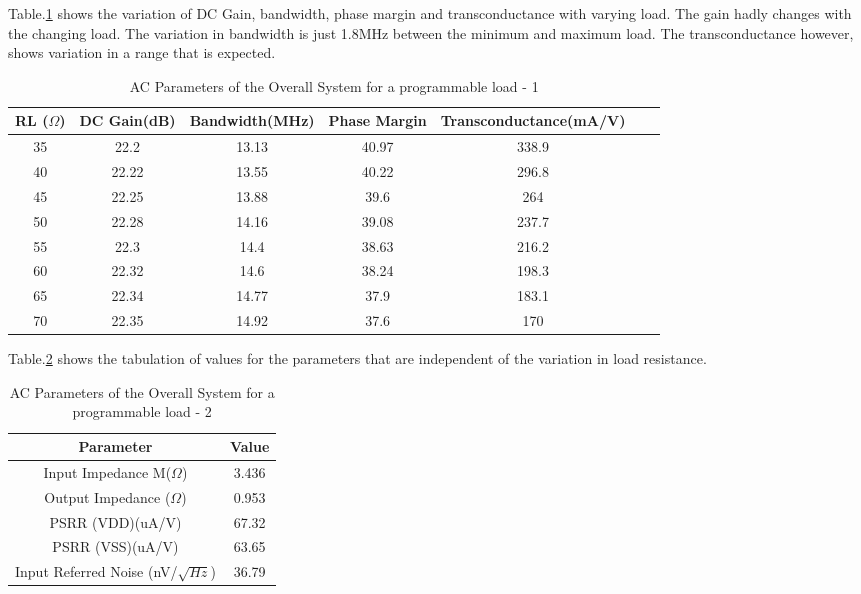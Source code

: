 Table.\ref{tab:RL_AC_1} shows the variation of DC Gain, bandwidth, phase margin and transconductance with varying load. The gain hadly changes with the changing load. The variation in bandwidth is just 1.8MHz between the minimum and maximum load. The transconductance however, shows variation in a range that is expected.
 
\begin{table} [H]
\centering
\begin{tabular}{@{}ccccccc@{}}
\toprule
RL ($\Omega$)		& DC Gain(dB)		& Bandwidth(MHz)		& Phase Margin			& Transconductance(mA/V)\\ \midrule
35		& 22.2 		& 13.13		& 40.97		& 338.9		\\
40		& 22.22 	& 13.55		& 40.22		& 296.8		\\
45		& 22.25 	& 13.88		& 39.6		& 264		\\
50		& 22.28 	& 14.16		& 39.08		& 237.7		\\
55		& 22.3 		& 14.4		& 38.63		& 216.2		\\
60		& 22.32 	& 14.6		& 38.24		& 198.3		\\
65		& 22.34 	& 14.77		& 37.9	 	& 183.1		\\
70		& 22.35 	& 14.92		& 37.6		& 170		\\
\bottomrule
\end{tabular}
\caption{AC Parameters of the Overall System for a programmable load - 1}
\label{tab:RL_AC_1}
\end{table}

Table.\ref{tab:RL_AC_2} shows the tabulation of values for the parameters that are independent of the variation in load resistance.

\begin{table} [H]
\centering
\begin{tabular}{@{}cc@{}}
\toprule
Parameter							& Value		\\ \midrule
Input Impedance M($\Omega$)			& 3.436 	\\
Output Impedance ($\Omega$)			& 0.953 	\\
PSRR (VDD)(uA/V)					& 67.32 	\\
PSRR (VSS)(uA/V)					& 63.65 	\\
Input Referred Noise (nV/$\sqrt{Hz}$)	& 36.79		\\
\bottomrule
\end{tabular}
\caption{AC Parameters of the Overall System for a programmable load - 2}
\label{tab:RL_AC_2}
\end{table}

